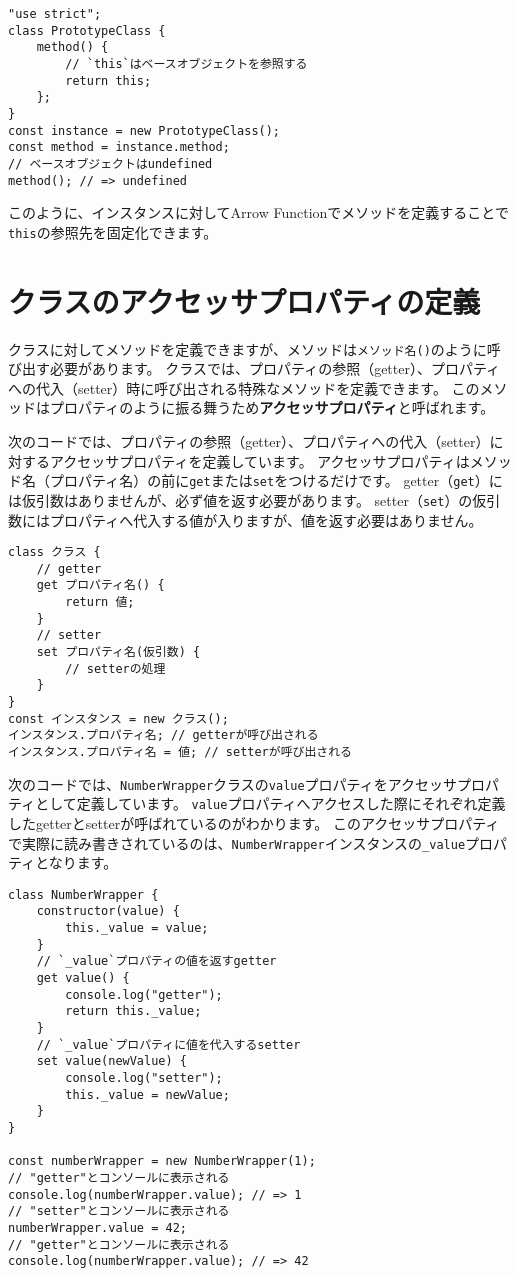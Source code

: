 \begin{lstlisting}
"use strict";
class PrototypeClass {
    method() {
        // `this`はベースオブジェクトを参照する
        return this;
    };
}
const instance = new PrototypeClass();
const method = instance.method;
// ベースオブジェクトはundefined
method(); // => undefined
\end{lstlisting}

このように、インスタンスに対してArrow
Functionでメソッドを定義することで\texttt{this}の参照先を固定化できます。

\hypertarget{class-accessor-property}{%
\section{クラスのアクセッサプロパティの定義}\label{class-accessor-property}}

クラスに対してメソッドを定義できますが、メソッドは\texttt{メソッド名()}のように呼び出す必要があります。
クラスでは、プロパティの参照（getter）、プロパティへの代入（setter）時に呼び出される特殊なメソッドを定義できます。
このメソッドはプロパティのように振る舞うため\textbf{アクセッサプロパティ}と呼ばれます。

次のコードでは、プロパティの参照（getter）、プロパティへの代入（setter）に対するアクセッサプロパティを定義しています。
アクセッサプロパティはメソッド名（プロパティ名）の前に\texttt{get}または\texttt{set}をつけるだけです。
getter（\texttt{get}）には仮引数はありませんが、必ず値を返す必要があります。
setter（\texttt{set}）の仮引数にはプロパティへ代入する値が入りますが、値を返す必要はありません。

\begin{lstlisting}
class クラス {
    // getter
    get プロパティ名() {
        return 値;
    }
    // setter
    set プロパティ名(仮引数) {
        // setterの処理
    }
}
const インスタンス = new クラス();
インスタンス.プロパティ名; // getterが呼び出される
インスタンス.プロパティ名 = 値; // setterが呼び出される
\end{lstlisting}

次のコードでは、\texttt{NumberWrapper}クラスの\texttt{value}プロパティをアクセッサプロパティとして定義しています。
\texttt{value}プロパティへアクセスした際にそれぞれ定義したgetterとsetterが呼ばれているのがわかります。
このアクセッサプロパティで実際に読み書きされているのは、\texttt{NumberWrapper}インスタンスの\texttt{\_value}プロパティとなります。

\begin{lstlisting}
class NumberWrapper {
    constructor(value) {
        this._value = value;
    }
    // `_value`プロパティの値を返すgetter
    get value() {
        console.log("getter");
        return this._value;
    }
    // `_value`プロパティに値を代入するsetter
    set value(newValue) {
        console.log("setter");
        this._value = newValue;
    }
}

const numberWrapper = new NumberWrapper(1);
// "getter"とコンソールに表示される
console.log(numberWrapper.value); // => 1
// "setter"とコンソールに表示される
numberWrapper.value = 42;
// "getter"とコンソールに表示される
console.log(numberWrapper.value); // => 42
\end{lstlisting}

